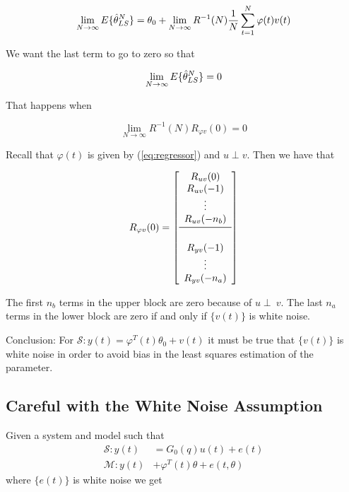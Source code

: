 \begin{equation*}
\lim_{N\to\infty} E\{\hat{\theta}_{LS}^N\} = \theta_0 + \lim_{N\to\infty}R^{-1}(N)\frac{1}{N}\sum_{t=1}^N\varphi(t)v(t)
\end{equation*}

We want the last term to go to zero so that

\begin{equation*}
\lim_{N\to\infty} E\{\hat{\theta}_{LS}^N\} = 0
\end{equation*}

That happens when

\begin{equation*}
\lim_{N\to\infty} R^{-1}(N)R_{\varphi v}(0) = 0
\end{equation*}

Recall that $\varphi(t)$ is given by (\ref{eq:regressor}) and $u\perp v$.
Then we have that

\begin{equation*}
R_{\varphi v}(0) = \left[\begin{array}{c} R_{uv}(0) \\ R_{uv}(-1) \\ \vdots \\ R_{uv}(-n_b) \\ \midrule \\ R_{yv}(-1) \\ \vdots \\ R_{yv}(-n_a) \end{array}\right]
\end{equation*}

The first $n_b$ terms in the upper block are zero because of $u\perp~v$.
The last $n_a$ terms in the lower block are zero if and only if $\{v (t)\}$ is white noise.

Conclusion: For $\mathcal{S}: y (t) = \varphi^T (t)\theta_0 + v (t)$ it must be true that $\{v (t)\}$ is white noise in order to avoid bias in the least squares estimation of the parameter.

\subsection{Careful with the White Noise Assumption}%
\label{sec:carefulwhitenoise}
Given a system and model such that
\begin{align*}
\mathcal{S}: y(t) &= G_0(q)u(t) + e(t) \\
\mathcal{M}: y(t) &+ \varphi^T(t)\theta + e(t,\theta)
\end{align*}
where $\{e(t)\}$ is white noise we get

